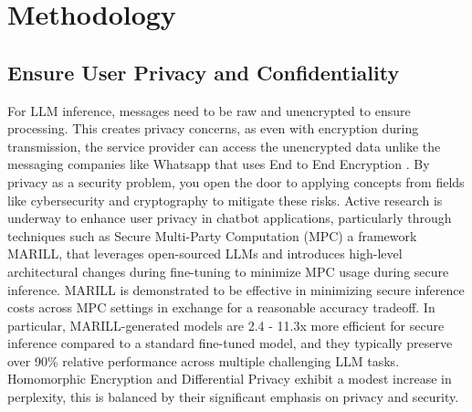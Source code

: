 \section{Methodology}
\subsection{Ensure User Privacy and Confidentiality}
For LLM inference, messages need to be raw and unencrypted to ensure processing. This creates privacy concerns, as even with encryption during transmission, the service provider can access the unencrypted data unlike the messaging companies like Whatsapp that uses End to End Encryption \cite{ermoshina2016end}. By privacy as a security problem, you open the door to applying concepts from fields like cybersecurity and cryptography to mitigate these risks. Active research is underway to enhance user privacy in chatbot applications, particularly through techniques such as Secure Multi-Party Computation (MPC) \cite{rathee2024mpc} a framework MARILL, that leverages open-sourced LLMs and introduces
high-level architectural changes during fine-tuning to minimize MPC usage during secure inference. MARILL is demonstrated to be effective in minimizing secure inference costs across MPC settings in exchange for a reasonable accuracy tradeoff. In particular, MARILL-generated models are 2.4 - 11.3x more efficient for secure inference compared to a standard fine-tuned model, and they typically preserve over 90\% relative performance across multiple challenging LLM tasks. Homomorphic Encryption \cite{kimprivacy} and Differential Privacy \cite{singh2024whispered} exhibit a modest increase in perplexity, this is balanced by their significant emphasis on privacy and security.

